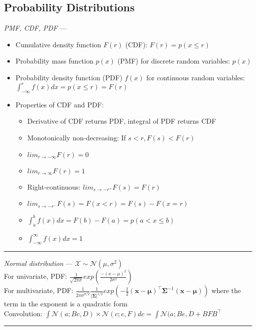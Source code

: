 \subsection*{Probability Distributions}
\emph{PMF, CDF, PDF} --- 
\begin{itemize}
    \item Cumulative density function $F(r)$ (CDF): $F(r) = p(x \leq r)$
    \item Probability mass function $p(x)$ (PMF) for discrete random variables: $p(x)$
    \item Probability density function (PDF) $f(x)$ for continuous random variables: $\int_{-\infty}^r f(x)dx = p(x \leq r) = F(r)$
    \item Properties of CDF and PDF:
    \begin{itemize}
        \item Derivative of CDF returns PDF, integral of PDF returns CDF
        \item Monotonically non-decreasing: If $s<r, F(s) < F(r)$
        \item $lim_{r\rightarrow-\infty} F(r) = 0$
        \item $lim_{r\rightarrow\infty} F(r) = 1$
        \item Right-continuous: $lim_{s\rightarrow-r^+} F(s) = F(r)$
        \item $lim_{s\rightarrow-r^-} F(s) = F(x < r) = F(s) - F(x = r)$
        \item $\int_a^b f(x)dx = F(b)-F(a) = p(a < x \leq b)$
        \item $\int_{-\infty}^\infty f(x)dx = 1$
    \end{itemize}
\end{itemize}

{\color{lightgray}\hrule height 0.001mm}

\emph{Normal distribution} --- 
$\mathcal{X} \sim \mathcal{N}(\mu, \sigma^2)$\\
For univariate, PDF: $\frac{1}{\sqrt{2\pi\sigma}} exp(\frac{-(x-\mu)^2}{2\sigma^2})$\\
For multivariate, PDF: $\frac{1}{{2\pi\sigma}^{n/2}} \frac{1}{|\boldsymbol{\Sigma}|^{1/2}} exp(-\frac{1}{2} (\boldsymbol{x}-\boldsymbol{\mu})^\intercal \boldsymbol{\Sigma}^{-1} (\boldsymbol{x}-\boldsymbol{\mu}))$ where the term in the exponent is a quadratic form\\
Convolution: $\int \mathcal{N}(a;Bc,D) \times \mathcal{N}(c;e,F) dc = \int \mathcal{N}(a;Be,D + BFB^\intercal$

{\color{lightgray}\hrule height 0.001mm}


